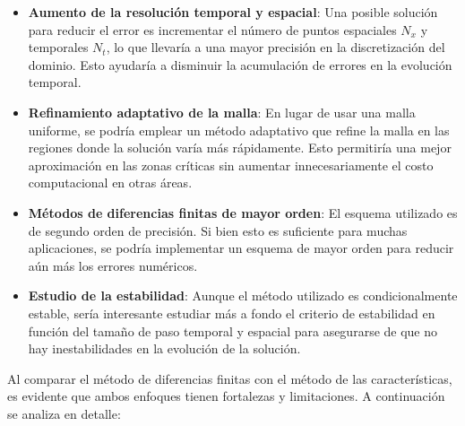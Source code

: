 \begin{itemize}
    \item \textbf{Aumento de la resolución temporal y espacial}: Una posible solución para reducir el error es incrementar el número de puntos espaciales \(N_x\) y temporales \(N_t\), lo que llevaría a una mayor precisión en la discretización del dominio. Esto ayudaría a disminuir la acumulación de errores en la evolución temporal.

    \item \textbf{Refinamiento adaptativo de la malla}: En lugar de usar una malla uniforme, se podría emplear un método adaptativo que refine la malla en las regiones donde la solución varía más rápidamente. Esto permitiría una mejor aproximación en las zonas críticas sin aumentar innecesariamente el costo computacional en otras áreas.

    \item \textbf{Métodos de diferencias finitas de mayor orden}: El esquema utilizado es de segundo orden de precisión. Si bien esto es suficiente para muchas aplicaciones, se podría implementar un esquema de mayor orden para reducir aún más los errores numéricos.

    \item \textbf{Estudio de la estabilidad}: Aunque el método utilizado es condicionalmente estable, sería interesante estudiar más a fondo el criterio de estabilidad en función del tamaño de paso temporal y espacial para asegurarse de que no hay inestabilidades en la evolución de la solución.
\end{itemize}


Al comparar el método de diferencias finitas con el método de las características, es evidente que ambos enfoques tienen fortalezas y limitaciones. A continuación se analiza en detalle:

